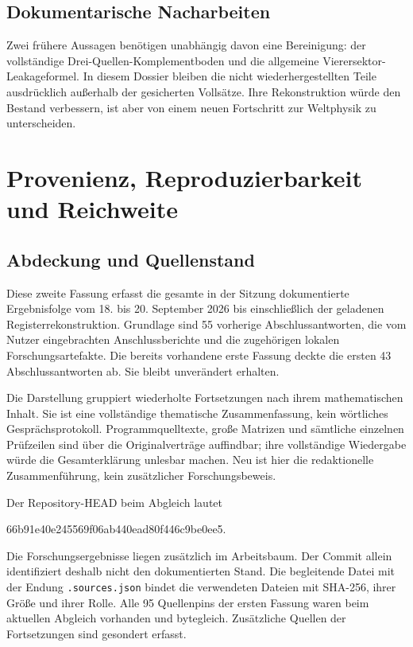 \section{Dokumentarische Nacharbeiten}
Zwei frühere Aussagen benötigen unabhängig davon eine Bereinigung: der vollständige Drei-Quellen-Komplementboden und die allgemeine Vierersektor-Leakageformel. In diesem Dossier bleiben die nicht wiederhergestellten Teile ausdrücklich außerhalb der gesicherten Vollsätze. Ihre Rekonstruktion würde den Bestand verbessern, ist aber von einem neuen Fortschritt zur Weltphysik zu unterscheiden.

\chapter{Provenienz, Reproduzierbarkeit und Reichweite}
\section{Abdeckung und Quellenstand}
Diese zweite Fassung erfasst die gesamte in der Sitzung dokumentierte Ergebnisfolge vom 18. bis 20. September 2026 bis einschließlich der geladenen Registerrekonstruktion. Grundlage sind 55 vorherige Abschlussantworten, die vom Nutzer eingebrachten Anschlussberichte und die zugehörigen lokalen Forschungsartefakte. Die bereits vorhandene erste Fassung deckte die ersten 43 Abschlussantworten ab. Sie bleibt unverändert erhalten.

Die Darstellung gruppiert wiederholte Fortsetzungen nach ihrem mathematischen Inhalt. Sie ist eine vollständige thematische Zusammenfassung, kein wörtliches Gesprächsprotokoll. Programmquelltexte, große Matrizen und sämtliche einzelnen Prüfzeilen sind über die Originalverträge auffindbar; ihre vollständige Wiedergabe würde die Gesamterklärung unlesbar machen. Neu ist hier die redaktionelle Zusammenführung, kein zusätzlicher Forschungsbeweis.

Der Repository-HEAD beim Abgleich lautet
\begin{center}\small\ttfamily 66b91e40e245569f06ab440ead80f446c9be0ee5.\end{center}
Die Forschungsergebnisse liegen zusätzlich im Arbeitsbaum. Der Commit allein identifiziert deshalb nicht den dokumentierten Stand. Die begleitende Datei mit der Endung \texttt{.sources.json} bindet die verwendeten Dateien mit SHA-256, ihrer Größe und ihrer Rolle. Alle 95 Quellenpins der ersten Fassung waren beim aktuellen Abgleich vorhanden und bytegleich. Zusätzliche Quellen der Fortsetzungen sind gesondert erfasst.

